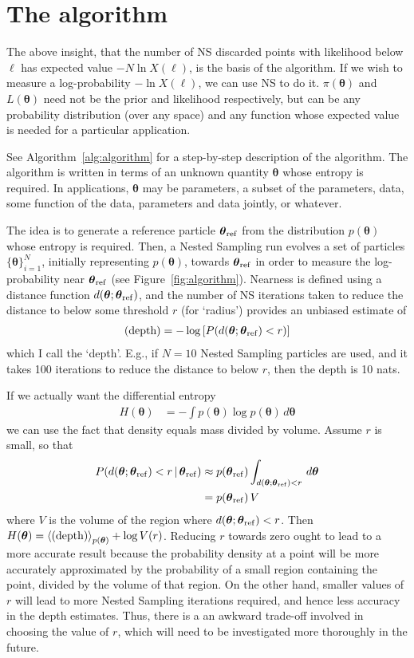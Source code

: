 \documentclass[entropy,article,accept,oneauthor,pdftex,10pt,a4paper]{mdpi}
\newcommand{\revision}{\color{darkblue}}
\newcommand{\x}{\boldsymbol{\theta}}
\newcommand{\depth}{(\textnormal{depth})}
\newcommand{\xref}{\x_{\rm ref}}
\begin{document}
\section{The algorithm}

The above insight, that the number of NS discarded points with likelihood
below $\ell$ has expected value $-N\ln X(\ell)$, is the basis of the algorithm.
If we wish to measure a log-probability $-\ln X(\ell)$, we can use NS to do it.
$\pi(\x)$ and $L(\x)$ need not be the prior and likelihood respectively, but
can be any probability distribution (over any space) and any function whose
expected value is needed for a particular application.

See Algorithm~\ref{alg:algorithm} for a step-by-step description of the
algorithm. The algorithm is written in terms of an unknown quantity $\x$
whose entropy is required. In applications, $\x$ may be parameters,
a subset of the parameters, data, some function of the data,
parameters and data jointly, or whatever.

The idea is to generate a reference particle $\xref$
from the distribution $p(\x)$
whose entropy is required. Then, a Nested Sampling run evolves a set of
particles $\{\x\}_{i=1}^N$, initially representing $p(\x)$,
towards $\xref$ in order to measure the log-probability near
$\xref$ (see Figure~\ref{fig:algorithm}).
Nearness is defined using a distance function
$d(\x; \xref)$, and the number of NS iterations taken to reduce
the distance to below some threshold {\revision $r$ (for `radius')}
provides an unbiased estimate of
\begin{align}
   \depth = -\log \left[ P(d(\x; \xref) < r) \right]
\end{align}
which I call the `depth'. E.g., if $N=10$ Nested Sampling particles are used,
and it takes 100 iterations to reduce the distance to below $r$, then the
depth is 10 nats.

If we actually want the differential entropy
\begin{align}
H(\x) &= -\int p(\x) \log p(\x) \, d\x
\end{align}
we can use the fact that density equals mass divided
by volume. Assume $r$ is small, so that
\begin{align}
P(d(\x; \xref) < r \,|\, \xref)
    &\approx
    p(\xref) \int_{d(\x; \xref) < r} \, d\x\\
    &= p(\xref) \, V
\end{align}
where $V$ is the volume of the region where $d(\x; \xref) < r$.
Then $H(\x) = \left< \depth \right>_{p(\x)} + \log V(r)$.
{\revision Reducing $r$ towards zero ought to lead to
a more accurate result because the probability density at a point will
be more accurately approximated by the probability of a small region containing
the point, divided by the volume of that region.
On the other hand, smaller values of $r$ will lead to more Nested Sampling
iterations required, and hence less accuracy in the depth estimates.
Thus, there is a an awkward trade-off involved in choosing the value of $r$,
which will need to be investigated more thoroughly in the future.}
\end{document}
